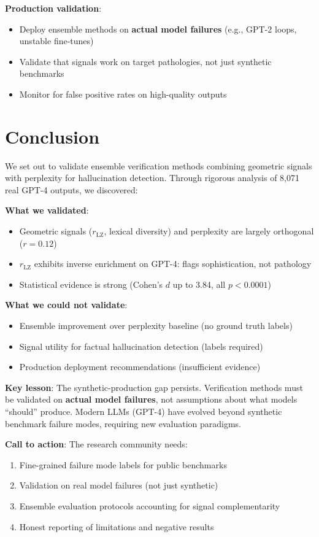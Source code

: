 \documentclass[11pt]{article}
\begin{document}
\textbf{Production validation}:
\begin{itemize}
\item Deploy ensemble methods on \textbf{actual model failures} (e.g., GPT-2 loops, unstable fine-tunes)
\item Validate that signals work on target pathologies, not just synthetic benchmarks
\item Monitor for false positive rates on high-quality outputs
\end{itemize}

\section{Conclusion}
\label{sec:conclusion}

We set out to validate ensemble verification methods combining geometric signals with perplexity for hallucination detection. Through rigorous analysis of 8,071 real GPT-4 outputs, we discovered:

\textbf{What we validated}:
\begin{itemize}
\item Geometric signals ($r_{\text{LZ}}$, lexical diversity) and perplexity are largely orthogonal ($r=0.12$)
\item $r_{\text{LZ}}$ exhibits inverse enrichment on GPT-4: flags sophistication, not pathology
\item Statistical evidence is strong (Cohen's $d$ up to 3.84, all $p<0.0001$)
\end{itemize}

\textbf{What we could not validate}:
\begin{itemize}
\item Ensemble improvement over perplexity baseline (no ground truth labels)
\item Signal utility for factual hallucination detection (labels required)
\item Production deployment recommendations (insufficient evidence)
\end{itemize}

\textbf{Key lesson}: The synthetic-production gap persists. Verification methods must be validated on \textbf{actual model failures}, not assumptions about what models ``should'' produce. Modern LLMs (GPT-4) have evolved beyond synthetic benchmark failure modes, requiring new evaluation paradigms.

\textbf{Call to action}: The research community needs:
\begin{enumerate}
\item Fine-grained failure mode labels for public benchmarks
\item Validation on real model failures (not just synthetic)
\item Ensemble evaluation protocols accounting for signal complementarity
\item Honest reporting of limitations and negative results
\end{enumerate}
\end{document}
